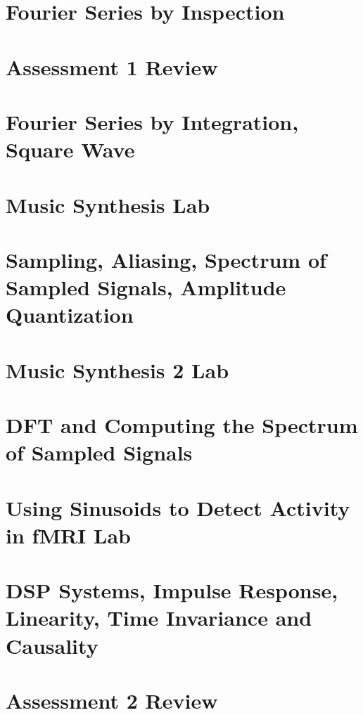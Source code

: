 \documentclass[12pt, letterpaper]{article}
\begin{document}
\section{Fourier Series by Inspection}
\section{Assessment 1 Review}
\section{Fourier Series by Integration, Square Wave}
\section{Music Synthesis Lab}
\section{Sampling, Aliasing, Spectrum of Sampled Signals, Amplitude Quantization}
\section{Music Synthesis 2 Lab}
\section{DFT and Computing the Spectrum of Sampled Signals}
\section{Using Sinusoids to Detect Activity in fMRI Lab}
\section{DSP Systems, Impulse Response, Linearity, Time Invariance and Causality}
\section{Assessment 2 Review}
\end{document}
